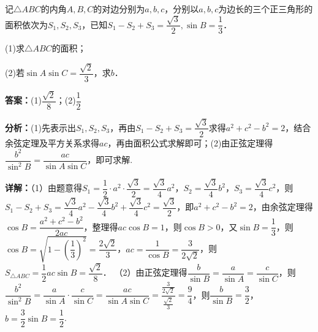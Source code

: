 \begin{question}[points=12]
记$\triangle ABC$的内角$A,B,C$的对边分别为$a,b,c$，分别以$a,b,c$为边长的三个正三角形的面积依次为$S_1,S_2,S_3$，已知$S_1-S_2+S_3=\dfrac{\sqrt{3}}{2},\sin B=\dfrac{1}{3}$．

(1)求$\triangle ABC$的面积；

(2)若$\sin A\sin C=\dfrac{\sqrt{2}}{3}$，求$b$．
\begin{solution}
\textbf{答案：}(1)$\dfrac{\sqrt{2}}{8}$；(2)$\dfrac{1}{2}$

\textbf{分析：}(1)先表示出$S_1,S_2,S_3$，再由$S_1-S_2+S_3=\dfrac{\sqrt{3}}{2}$求得$a^2+c^2-b^2=2$，结合余弦定理及平方关系求得$ac$，再由面积公式求解即可；(2)由正弦定理得$\dfrac{b^2}{\sin^2 B}=\dfrac{ac}{\sin A\sin C}$，即可求解.

\textbf{详解：}（1）由题意得$S_1=\dfrac{1}{2}\cdot a^2\cdot\dfrac{\sqrt{3}}{2}=\dfrac{\sqrt{3}}{4}a^2$，$S_2=\dfrac{\sqrt{3}}{4}b^2$，$S_3=\dfrac{\sqrt{3}}{4}c^2$，则$S_1-S_2+S_3=\dfrac{\sqrt{3}}{4}a^2-\dfrac{\sqrt{3}}{4}b^2+\dfrac{\sqrt{3}}{4}c^2=\dfrac{\sqrt{3}}{2}$，即$a^2+c^2-b^2=2$，由余弦定理得$\cos B=\dfrac{a^2+c^2-b^2}{2ac}$，整理得$ac\cos B=1$，则$\cos B>0$，又$\sin B=\dfrac{1}{3}$，则$\cos B=\sqrt{1-\left(\dfrac{1}{3}\right)^2}=\dfrac{2\sqrt{2}}{3}$，$ac=\dfrac{1}{\cos B}=\dfrac{3}{2\sqrt{2}}$，则$S_{\triangle ABC}=\dfrac{1}{2}ac\sin B=\dfrac{\sqrt{2}}{8}$．
（2）由正弦定理得$\dfrac{b}{\sin B}=\dfrac{a}{\sin A}=\dfrac{c}{\sin C}$，则$\dfrac{b^2}{\sin^2 B}=\dfrac{a}{\sin A}\cdot\dfrac{c}{\sin C}=\dfrac{ac}{\sin A\sin C}=\dfrac{\frac{3}{2\sqrt{2}}}{\frac{\sqrt{2}}{3}}=\dfrac{9}{4}$，则$\dfrac{b}{\sin B}=\dfrac{3}{2}$，$b=\dfrac{3}{2}\sin B=\dfrac{1}{2}$.
\end{solution}
\end{question}


